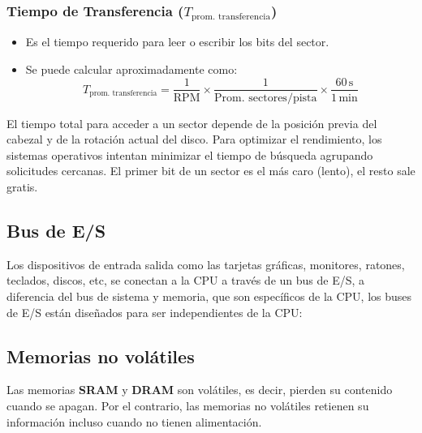 \subsubsection*{Tiempo de Transferencia (\(T_{\text{prom. transferencia}}\))}
\begin{itemize}
    \item Es el tiempo requerido para leer o escribir los bits del sector.
    \item Se puede calcular aproximadamente como:
    \begin{equation*}
    T_{\text{prom. transferencia}} = \frac{1}{\text{RPM}} \times \frac{1}{\text{Prom. sectores/pista}} \times \frac{60 \, \text{s}}{1 \, \text{min}}
    \end{equation*}
\end{itemize}
El tiempo total para acceder a un sector depende de la posición previa del cabezal y de la rotación actual del disco.
Para optimizar el rendimiento, los sistemas operativos intentan minimizar el tiempo de búsqueda agrupando solicitudes cercanas. El primer bit de un sector es el más caro (lento), el resto sale 
gratis.
\subsection{Bus de E/S}
Los dispositivos de entrada salida como las tarjetas gráficas, monitores, ratones, teclados, discos, etc, se conectan a la CPU a través de un bus de E/S, a diferencia del bus de sistema y memoria, que son 
específicos de la CPU, los buses de E/S están diseñados para ser independientes de la CPU:
\subsection{Memorias no volátiles}
    Las memorias \textbf{SRAM} y \textbf{DRAM} son volátiles, es decir, pierden su contenido cuando se apagan.
     Por el contrario, las memorias no volátiles retienen su información incluso cuando no tienen alimentación.
